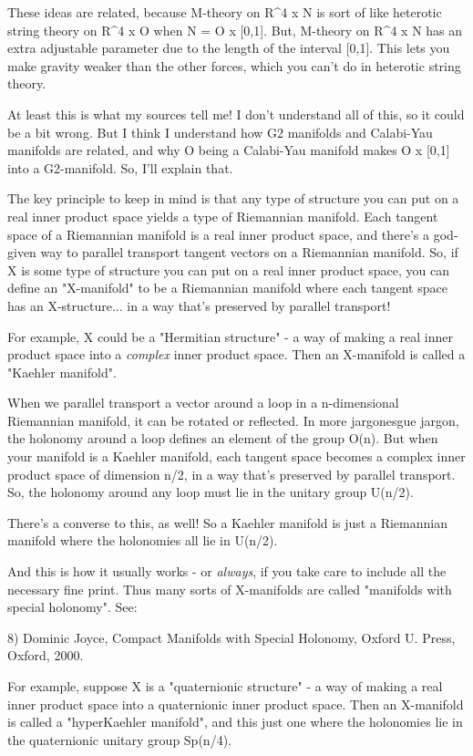These ideas are related, because M-theory on R^{4} x N is sort of 
like heterotic string theory on R^{4} x O when N = O x [0,1].  But, 
M-theory on R^{4} x N has an extra adjustable parameter due to the 
length of the interval [0,1].  This lets you make gravity weaker 
than the other forces, which you can't do in heterotic string theory.

At least this is what my sources tell me!   I don't understand all 
of this, so it could be a bit wrong.  But I think I understand how
G2 manifolds and Calabi-Yau manifolds are related, and why O being a
Calabi-Yau manifold makes O x [0,1] into a G2-manifold.  So, I'll explain 
that.

The key principle to keep in mind is that any type of structure you
can put on a real inner product space yields a type of Riemannian 
manifold.  Each tangent space of a Riemannian manifold is a real inner
product space, and there's a god-given way to parallel transport tangent 
vectors on a Riemannian manifold.  So, if X is some type of structure 
you can put on a real inner product space, you can define an "X-manifold" 
to be a Riemannian manifold where each tangent space has an X-structure... 
in a way that's preserved by parallel transport!

For example, X could be a "Hermitian structure" - a way of making a
real inner product space into a \emph{complex} inner product space.  Then 
an X-manifold is called a "Kaehler manifold".  

When we parallel transport a vector around a loop in a n-dimensional
Riemannian manifold, it can be rotated or reflected.  In more jargonesgue
jargon, the holonomy around a loop defines an element of the group O(n).  
But when your manifold is a Kaehler manifold, each tangent space becomes 
a complex inner product space of dimension n/2, in a way that's preserved 
by parallel transport.  So, the holonomy around any loop must lie in 
the unitary group U(n/2).   

There's a converse to this, as well!  So a Kaehler manifold is just a 
Riemannian manifold where the holonomies all lie in U(n/2).  

And this is how it usually works - or \emph{always}, if you take care
to include all the necessary fine print.  Thus many sorts of
X-manifolds are called "manifolds with special holonomy".  See:

8) Dominic Joyce, Compact Manifolds with Special Holonomy, Oxford U. Press, 
Oxford, 2000. 

For example, suppose X is a "quaternionic structure" - a way
of making a real inner product space into a quaternionic inner product
space.  Then an X-manifold is called a "hyperKaehler
manifold", and this just one where the holonomies lie in the
quaternionic unitary group Sp(n/4).

